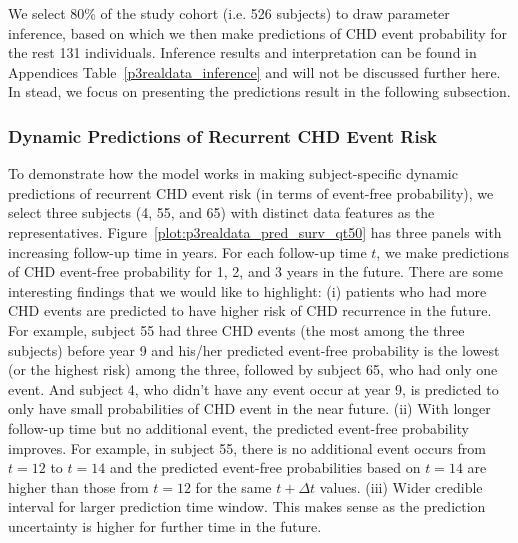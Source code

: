 We select 80\% of the study cohort (i.e. 526 subjects) to draw parameter inference, based on which we then make predictions of CHD event probability for the rest 131 individuals. Inference results and interpretation can be found in Appendices Table~\ref{p3realdata_inference} and will not be discussed further here. In stead, we focus on presenting the predictions result in the following subsection.


\subsubsection{Dynamic Predictions of Recurrent CHD Event Risk}\label{sec:p3data_results}
To demonstrate how the model works in making subject-specific dynamic predictions of recurrent CHD event risk (in terms of event-free probability), we select three subjects (4, 55, and 65) with distinct data features as the representatives. Figure~\ref{plot:p3realdata_pred_surv_qt50} has three panels with increasing follow-up time in years. For each follow-up time $t$, we make predictions of CHD event-free probability for 1, 2, and 3 years in the future. There are some interesting findings that we would like to highlight: (i) patients who had more CHD events are predicted to have higher risk of CHD recurrence in the future. For example, subject 55 had three CHD events (the most among the three subjects) before year 9 and his/her predicted event-free probability is the lowest (or the highest risk) among the three, followed by subject 65, who had only one event. And subject 4, who didn't have any event occur at year 9, is predicted to only have small probabilities of CHD event in the near future. (ii) With longer follow-up time but no additional event, the predicted event-free probability improves. For example, in subject 55, there is no additional event occurs from $t=12$ to $t=14$ and the predicted event-free probabilities based on $t=14$ are higher than those from $t=12$ for the same $t+\Delta t$ values. (iii) Wider credible interval for larger prediction time window. This makes sense as the prediction uncertainty is higher for further time in the future.

